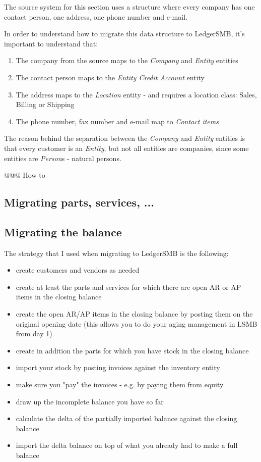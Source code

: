 The source system for this section uses a structure where every company has one
contact person, one address, one phone number and e-mail.

In order to understand how to migrate this data structure to LedgerSMB, it's
important to understand that:

\begin{enumerate}
\item The company from the source maps to the \emph{Company} and \emph{Entity} entities
\item The contact person maps to the \emph{Entity Credit Account} entity
\item The address maps to the \emph{Location} entity - and requires a location class: Sales, Billing or Shipping
\item The phone number, fax number and e-mail map to \emph{Contact items}
\end{enumerate}

The reason behind the separation between the \emph{Company} and \emph{Entity} entities
is that every customer is an \emph{Entity}, but not all entities are companies, since
some entities are \emph{Person}s - natural persons.

@@@ How to

\subsection{Migrating parts, services, ...}
\label{subsec-migration-others-products}

\subsection{Migrating the balance}
\label{subsec-migration-others-balance}

The strategy that I used when migrating to LedgerSMB is the following:

\begin{itemize}
\item create customers and vendors as needed
\item create at least the parts and services for which there are open AR or AP items in the closing balance
\item create the open AR/AP items in the closing balance by posting them on the original opening date (this allows you to do your aging management in LSMB from day 1)
\item create in addition the parts for which you have stock in the closing balance
\item import your stock by posting invoices against the inventory entity
\item make sure you "pay" the invoices - e.g. by paying them from equity
\item draw up the incomplete balance you have so far
\item calculate the delta of the partially imported balance against the closing balance
\item import the delta balance on top of what you already had to make a full balance
\end{itemize}


